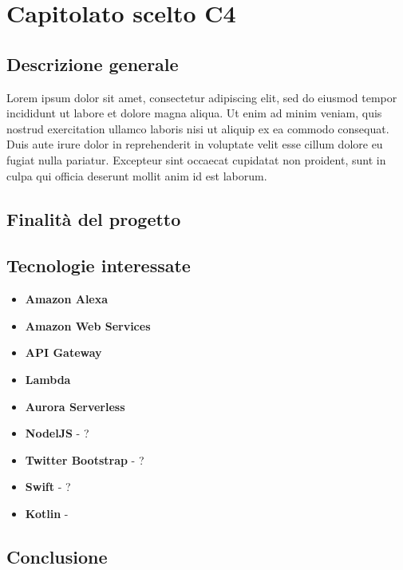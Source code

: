 \chapter{Capitolato scelto C4}
\section{Descrizione generale}
Lorem ipsum dolor sit amet, consectetur adipiscing elit, sed do eiusmod tempor incididunt ut labore et dolore magna aliqua. Ut enim ad minim veniam, quis nostrud exercitation ullamco laboris nisi ut aliquip ex ea commodo consequat. Duis aute irure dolor in reprehenderit in voluptate velit esse cillum dolore eu fugiat nulla pariatur. Excepteur sint occaecat cupidatat non proident, sunt in culpa qui officia deserunt mollit anim id est laborum.\\
\section{Finalit\`a del progetto}

\section{Tecnologie interessate}
\begin{itemize}
	\item \textbf{Amazon Alexa}
	\item \textbf{Amazon Web Services}
	\item \textbf{API Gateway}
	\item \textbf{Lambda}
	\item \textbf{Aurora Serverless}
	\item \textbf{NodelJS} - ?
	\item \textbf{Twitter Bootstrap} - ?
	\item \textbf{Swift} - ?
	\item \textbf{Kotlin} - 
\end{itemize}


\section{Conclusione}

